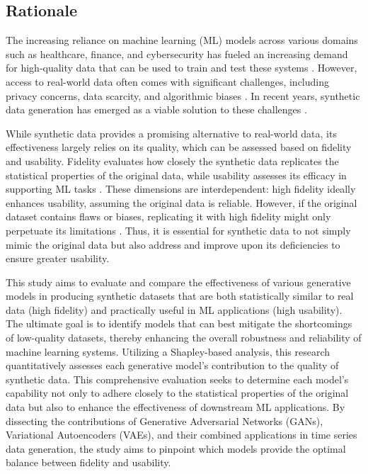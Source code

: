 \documentclass[11pt]{article}
\begin{document}
\subsection{Rationale}
The increasing reliance on machine learning (ML) models across various domains such as healthcare, finance, and cybersecurity has fueled an increasing demand for high-quality data that can be used to train and test these systems \parencite{jordon_synthetic_2022, goyal_systematic_2024}. However, access to real-world data often comes with significant challenges, including privacy concerns, data scarcity, and algorithmic biases \parencite{lu_machine_2024, hudovernik_benchmarking_2024}. In recent years, synthetic data generation has emerged as a viable solution to these challenges \parencite{goyal_systematic_2024}.

While synthetic data provides a promising alternative to real-world data, its effectiveness largely relies on its quality, which can be assessed based on fidelity and usability. Fidelity evaluates how closely the synthetic data replicates the statistical properties of the original data, while usability assesses its efficacy in supporting ML tasks \parencite{loni_review_2025}. These dimensions are interdependent: high fidelity ideally enhances usability, assuming the original data is reliable. However, if the original dataset contains flaws or biases, replicating it with high fidelity might only perpetuate its limitations \parencite{shahul_hameed_bias_2024}. Thus, it is essential for synthetic data to not simply mimic the original data but also address and improve upon its deficiencies to ensure greater usability.

This study aims to evaluate and compare the effectiveness of various generative models in producing synthetic datasets that are both statistically similar to real data (high fidelity) and practically useful in ML applications (high usability). The ultimate goal is to identify models that can best mitigate the shortcomings of low-quality datasets, thereby enhancing the overall robustness and reliability of machine learning systems. Utilizing a Shapley-based analysis, this research quantitatively assesses each generative model's contribution to the quality of synthetic data. This comprehensive evaluation seeks to determine each model's capability not only to adhere closely to the statistical properties of the original data but also to enhance the effectiveness of downstream ML applications. By dissecting the contributions of Generative Adversarial Networks (GANs), Variational Autoencoders (VAEs), and their combined applications in time series data generation, the study aims to pinpoint which models provide the optimal balance between fidelity and usability.
\end{document}
